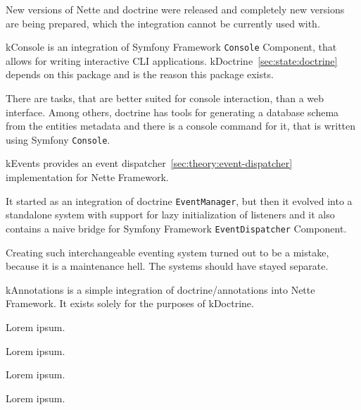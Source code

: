 New versions of Nette and \gls{doctrine} were released and completely new versions are being prepared, which the integration cannot be currently used with.

 \label{sec:state:console}

\gls{kConsole} is an integration of Symfony Framework \lstinline{Console} Component, that allows for writing interactive CLI applications. \gls{kDoctrine}~\ref{sec:state:doctrine} depends on this package and is the reason this package exists.

There are tasks, that are better suited for console interaction, than a web interface. Among others, \gls{doctrine} has tools for generating a database schema from the entities metadata and there is a console command for it, that is written using Symfony \lstinline{Console}.

 \label{sec:state:events}

\gls{kEvents} provides an event dispatcher~\ref{sec:theory:event-dispatcher} implementation for Nette Framework.

It started as an integration of \gls{doctrine} \lstinline{EventManager}, but then it evolved into a standalone system with support for lazy initialization of listeners and it also contains a naive bridge for Symfony Framework \lstinline{EventDispatcher} Component.

Creating such interchangeable eventing system turned out to be a mistake, because it is a maintenance hell. The systems should have stayed separate.

 \label{sec:state:annotations}

\gls{kAnnotations} is a simple integration of doctrine/annotations into Nette Framework. It exists solely for the purposes of \gls{kDoctrine}.

 \label{sec:state:doctrine-cache}

Lorem ipsum.

 \label{sec:state:doctrine-magic-accessors}

Lorem ipsum.

 \label{sec:state:doctrine-collections-readonly}

Lorem ipsum.

 \label{sec:state:doctrine-collections-lazy}

Lorem ipsum.

